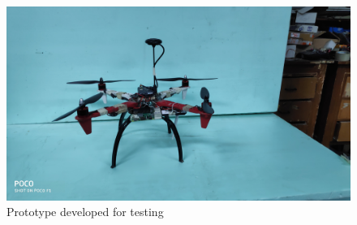 \begin{spacing}{2}
\begin{table}[h]
    \label{tab:selcomps}
\end{table}

\begin{figure}[h]
    \centering
    \includegraphics[width=0.8\linewidth, trim=350 200 1200 220,clip]{image/prototype.jpg}
    \caption{Prototype developed for testing}
    \label{fig:proto}
\end{figure}
\end{spacing}